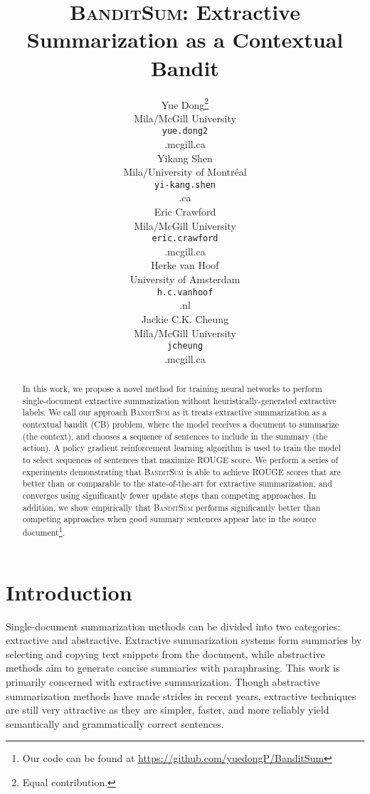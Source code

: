 \documentclass[11pt,a4paper]{article}
\title{\textsc{BanditSum}: Extractive Summarization as a Contextual Bandit}
\author{Yue Dong\thanks{\;\;Equal contribution. 
} \\
  Mila/McGill University \\ 
  {\tt yue.dong2}\\{\tt@mail.mcgill.ca} \\
  \And
  Yikang Shen \\
  Mila/University of Montr\'eal \\ 
  {\tt yi-kang.shen}\\{\tt@umontreal.ca} \\
  \AND
  Eric Crawford \\
  Mila/McGill University\\
  {\tt eric.crawford}\\{\tt@mail.mcgill.ca} \\
  \And
  Herke van Hoof \\
  University of Amsterdam\\
  {\tt h.c.vanhoof}\\{\tt@uva.nl} \\
  \And
  Jackie C.K. Cheung \\
  Mila/McGill University\\
  {\tt jcheung}\\{\tt@cs.mcgill.ca}
  }
\date{}
\newcommand{\B}{\textsc{BanditSum }}
\begin{document}
\maketitle
\begin{abstract}
In this work, we propose a novel method for training neural networks to perform single-document extractive summarization without heuristically-generated extractive labels. We call our approach \B as it treats extractive summarization as a contextual bandit (CB) problem, where the model receives a document to summarize (the context), and chooses a sequence of sentences to include in the summary (the action). A policy gradient reinforcement learning algorithm is used to train the model to select sequences of sentences that maximize ROUGE score. We perform a series of experiments demonstrating that \B is able to achieve ROUGE scores that are better than or comparable to the state-of-the-art for extractive summarization, and converges using significantly fewer update steps than competing approaches. In addition, we show empirically that \B performs significantly better than competing approaches when good summary sentences appear late in the source document\footnote{Our code can be found at \url{https://github.com/yuedongP/BanditSum}}.

\end{abstract}

\section{Introduction}
Single-document summarization methods can be divided into two categories: extractive and abstractive. Extractive summarization systems form summaries by selecting and copying text snippets from the document, while abstractive methods aim to generate concise summaries with paraphrasing. This work is primarily concerned with extractive summarization. Though abstractive summarization methods have made strides in recent years, extractive techniques are still very attractive as they are simpler, faster, and more reliably yield semantically and grammatically correct sentences.
\end{document}
